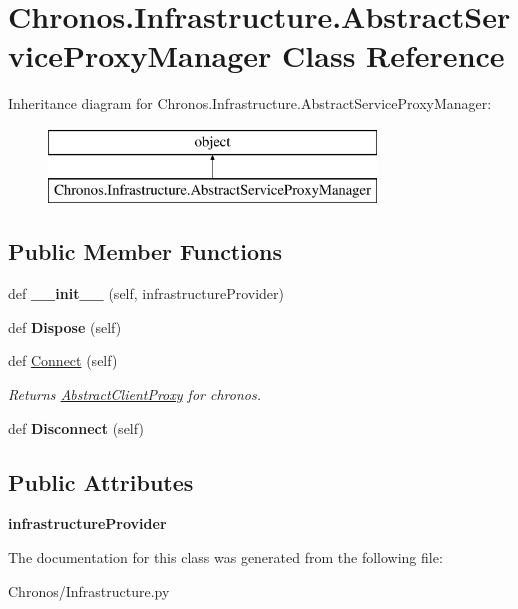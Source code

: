 \hypertarget{classChronos_1_1Infrastructure_1_1AbstractServiceProxyManager}{}\section{Chronos.\+Infrastructure.\+Abstract\+Service\+Proxy\+Manager Class Reference}
\label{classChronos_1_1Infrastructure_1_1AbstractServiceProxyManager}
Inheritance diagram for Chronos.\+Infrastructure.\+Abstract\+Service\+Proxy\+Manager\+:\begin{figure}[H]
\begin{center}
\leavevmode
\includegraphics[height=2.000000cm]{classChronos_1_1Infrastructure_1_1AbstractServiceProxyManager}
\end{center}
\end{figure}
\subsection*{Public Member Functions}
\begin{DoxyCompactItemize}
\item 
def {\bfseries \+\_\+\+\_\+init\+\_\+\+\_\+} (self, infrastructure\+Provider)
\item 
def {\bfseries Dispose} (self)
\item 
def \hyperlink{group__Chronos_ga7156c455573fce038d857e4b950a25b3}{Connect} (self)
\begin{DoxyCompactList}\small\item\em Returns \hyperlink{classChronos_1_1Infrastructure_1_1AbstractClientProxy}{Abstract\+Client\+Proxy} for chronos. \end{DoxyCompactList}\item 
def {\bfseries Disconnect} (self)
\end{DoxyCompactItemize}
\subsection*{Public Attributes}
\begin{DoxyCompactItemize}
\item 
{\bfseries infrastructure\+Provider}
\end{DoxyCompactItemize}


The documentation for this class was generated from the following file\+:\begin{DoxyCompactItemize}
\item 
Chronos/Infrastructure.\+py\end{DoxyCompactItemize}
